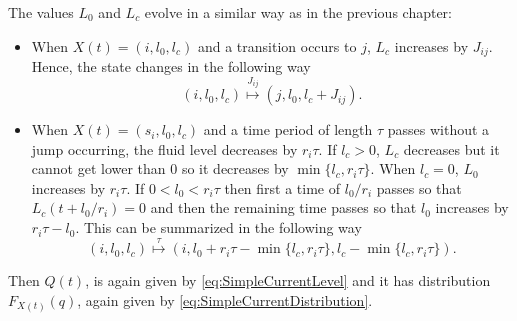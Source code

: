 The values $L_0$ and $L_c$ evolve in a similar way as in the previous chapter:
\begin{itemize}
	\item When $X(t)=(i,l_0,l_c)$ and a transition occurs to $j$, $L_c$ increases by $J_{ij}$.
	Hence, the state changes in the following way
	\begin{equation}\label{eq:MmfmJumpEvolution}
	(i,l_0,l_c)\stackrel{J_{ij}}{\mapsto} (j,l_0,l_c+J_{ij}).
	\end{equation}
	\item When $X(t)=(s_i,l_0,l_c)$ and a time period of length $\tau$ passes without a jump occurring, the fluid level decreases by $r_i\tau$.
	If $l_c>0$, $L_c$ decreases but it cannot get lower than $0$ so it decreases by $\min\{l_c,r_i\tau\}$.
	When $l_c=0$, $L_0$ increases by $r_i\tau$.
	If $0<l_0<r_i\tau$ then first a time of $l_0/r_i$ passes so that $L_c(t+l_0/r_i)=0$ and then the remaining time passes so that $l_0$ increases by $r_i\tau-l_0$.
	This can be summarized in the following way
	\begin{equation}\label{eq:MmfmAgeEvolution}
	(i,l_0,l_c)\stackrel\tau\mapsto (i,l_0+r_i\tau-\min\{l_c,r_i\tau\},l_c-\min\{l_c,r_i\tau\}).
	\end{equation}
\end{itemize}
Then $Q(t)$, is again given by \eqref{eq:SimpleCurrentLevel} and it has distribution $F_{X(t)}(q)$,  again given by \eqref{eq:SimpleCurrentDistribution}.


